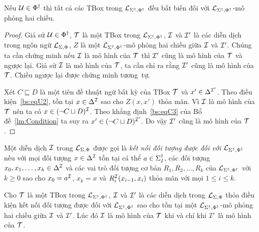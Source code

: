 \begin{Corollary}
	\label{co:TBoxInvariant}
	Nếu $\mathcal{U} \in \Phi^\dag$ thì tất cả các TBox trong $\mathcal{L}_{\Sigma^\dag,\Phi^\dag}$ đều bất biến đối với $\mathcal{L}_{\Sigma^\dag,\Phi^\dag}$-mô phỏng hai chiều.\myend
\end{Corollary}

\begin{proof}
	Giả sử $\mathcal{U} \in \Phi^\dag$, $\mathcal{T}$ là một TBox trong $\mathcal{L}_{\Sigma^\dag,\Phi^\dag}$, $\mathcal{I}$ và $\mathcal{I}'$ là các diễn dịch trong ngôn ngữ $\mathcal{L}_{\Sigma,\Phi}$, $Z$ là một $\mathcal{L}_{\Sigma^\dag,\Phi^\dag}$-mô phỏng hai chiều giữa $\mathcal{I}$ và $\mathcal{I}'$. Chúng ta cần chứng minh nếu $\mathcal{I}$ là mô hình của $\mathcal{T}$ thì $\mathcal{I}'$ cũng là mô hình của $\mathcal{T}$ và ngược lại. Giả sử $\mathcal{I}$ là mô hình của $\mathcal{T}$, ta cần chỉ ra rằng $\mathcal{I}'$ cũng là mô hình của $\mathcal{T}$. Chiều ngược lại được chứng minh tương~tự.
	
	Xét $C \sqsubseteq D$ là một tiên đề thuật ngữ bất kỳ của TBox $\mathcal{T}$ và $x' \in \Delta^{\mathcal{I}'}$. Theo điều kiện~\eqref{bs:eqU2}, tồn tại $x \in \Delta^{\mathcal{I}}$ sao cho $Z(x, x')$ thỏa mãn. Vì $\mathcal{I}$ là mô hình của $\mathcal{T}$ nên ta có $x \in (\neg C \sqcup D)^{\mathcal{I}}$. Theo khẳng định~\eqref{bs:eqC3} của Bổ đề~\ref{lm:Condition} ta suy ra $x' \in (\neg C \sqcup D)^{\mathcal{I}'}$. Do vậy $\mathcal{I}'$ cũng là mô hình của $\mathcal{T}$.
\end{proof}

Một diễn dịch $\mathcal{I}$ trong $\mathcal{L}_{\Sigma,\Phi}$ được gọi là {\em kết nối đối tượng được đối với $\mathcal{L}_{\Sigma^\dag,\Phi^\dag}$} nếu với mọi đối tượng $x \in \Delta^{\mathcal{I}}$ tồn tại cá thể $a \in \Sigma^\dag_I$, các đối tượng $x_0, x_1, \ldots, x_k \in \Delta^{\mathcal{I}}$ và các vai trò đối tượng cơ bản $R_1, R_2, \ldots, R_k$ của $\mathcal{L}_{\Sigma^\dag,\Phi^\dag}$ với $k \geq 0$ sao cho $x_0 = a^{\mathcal{I}}$, $x_k = x$ và $R_i^{\mathcal{I}}(x_{i-1}, x_i)$ thỏa mãn với mọi $1 \leq i \leq k$.

\begin{Theorem}
\label{th:TBoxInvariant}
	Cho $\mathcal{T}$ là một TBox trong $\mathcal{L}_{\Sigma^\dag,\Phi^\dag}$, $\mathcal{I}$ và $\mathcal{I}'$ là các diễn dịch trong $\mathcal{L}_{\Sigma,\Phi}$ thỏa điều kiện kết nối đối tượng được đối với $\mathcal{L}_{\Sigma^\dag,\Phi^\dag}$ sao cho tồn tại một $\mathcal{L}_{\Sigma^\dag,\Phi^\dag}$-mô phỏng hai chiều giữa $\mathcal{I}$ và $\mathcal{I}'$. Lúc đó $\mathcal{I}$ là mô hình của $\mathcal{T}$ khi và chỉ khi $\mathcal{I}'$ là mô hình của $\mathcal{T}$.\myend
\end{Theorem}

